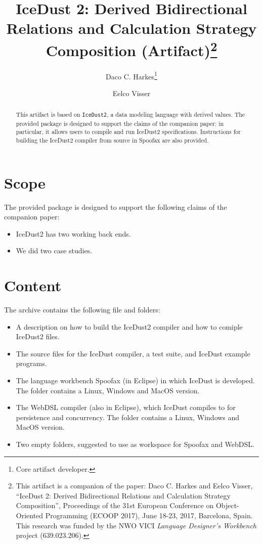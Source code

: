 \documentclass[a4paper,USenglish]{darts}
\title{IceDust 2: Derived Bidirectional Relations and Calculation Strategy Composition (Artifact)\footnote{This artifact is a companion of the paper:  Daco C. Harkes and Eelco Visser, ``IceDust 2: Derived Bidirectional Relations and Calculation Strategy Composition'', Proceedings of the 31st European Conference on Object-Oriented Programming (ECOOP 2017), June 18-23, 2017, Barcelona, Spain. This research was funded by the NWO VICI \textit{Language Designer’s Workbench} project (639.023.206).}}
\author[1]{Daco C. Harkes\footnote{Core artifact developer.}}
\author[2]{Eelco Visser}
\affil[1]{Delft University of Technology, Delft, The Netherlands\\
  \texttt{d.c.harkes@tudelft.nl}}
\affil[2]{Delft University of Technology, Delft, The Netherlands\\
  \texttt{e.visser@tudelft.nl}}
\newenvironment{scope}{\section{Scope}}{}
\newenvironment{content}{\section{Content}}{}
\begin{document}
\maketitle

\begin{abstract}
  This artifact is based on {\tt IceDust2}, a data modeling language with derived values.
  The provided package is designed to support the claims of the companion paper: in particular, it allows users to compile and run IceDust2 specifications.
  Instructions for building the IceDust2 compiler from source in Spoofax are also provided.
\end{abstract}


\begin{scope}
  The provided package is designed to support the following claims of the companion paper:
  \begin{itemize}
    \item IceDust2 has two working back ends.
    \item We did two case studies.
  \end{itemize}  
\end{scope}

\begin{content}
  The archive contains the following file and folders:
  \begin{itemize}
  \item A description on how to build the IceDust2 compiler and how to comiple IceDust2 files.
  \item The source files for the IceDust compiler, a test suite, and IceDust example programs.
  \item The language workbench Spoofax (in Eclipse) in which IceDust is developed. The folder contains a Linux, Windows and MacOS version.
  \item The WebDSL compiler (also in Eclipse), which IceDust compiles to for persistence and concurrency. The folder contains a Linux, Windows and MacOS version.
  \item Two empty folders, suggested to use as workspace for Spoofax and WebDSL.
  \end{itemize}
\end{content} 
\end{document}
